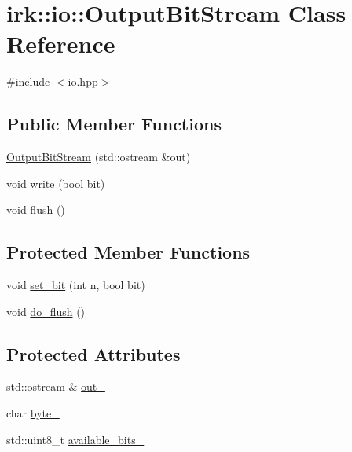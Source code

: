 \hypertarget{classirk_1_1io_1_1OutputBitStream}{}\section{irk\+:\+:io\+:\+:Output\+Bit\+Stream Class Reference}
\label{classirk_1_1io_1_1OutputBitStream}


{\ttfamily \#include $<$io.\+hpp$>$}

\subsection*{Public Member Functions}
\begin{DoxyCompactItemize}
\item 
\mbox{\hyperlink{classirk_1_1io_1_1OutputBitStream_a09be387800221d227a8d2f7711a1df9a}{Output\+Bit\+Stream}} (std\+::ostream \&out)
\item 
void \mbox{\hyperlink{classirk_1_1io_1_1OutputBitStream_ada8f9a48f0e7ab925c6825f70c3761f6}{write}} (bool bit)
\item 
void \mbox{\hyperlink{classirk_1_1io_1_1OutputBitStream_a7222961ff1996d3e322ff647e4683478}{flush}} ()
\end{DoxyCompactItemize}
\subsection*{Protected Member Functions}
\begin{DoxyCompactItemize}
\item 
void \mbox{\hyperlink{classirk_1_1io_1_1OutputBitStream_acb934dcfb45891f11af8d250fef95335}{set\+\_\+bit}} (int n, bool bit)
\item 
void \mbox{\hyperlink{classirk_1_1io_1_1OutputBitStream_a7b69dabd8223aff5c57339997abe7f5f}{do\+\_\+flush}} ()
\end{DoxyCompactItemize}
\subsection*{Protected Attributes}
\begin{DoxyCompactItemize}
\item 
std\+::ostream \& \mbox{\hyperlink{classirk_1_1io_1_1OutputBitStream_a570da7c5fc4509bedf6e1701b3a2ea6c}{out\+\_\+}}
\item 
char \mbox{\hyperlink{classirk_1_1io_1_1OutputBitStream_ad1ff5f68aeccbfdaea26a676b92f1081}{byte\+\_\+}}
\item 
std\+::uint8\+\_\+t \mbox{\hyperlink{classirk_1_1io_1_1OutputBitStream_abccbb4b943d9d19c7f733bb1250a2a09}{available\+\_\+bits\+\_\+}}
\end{DoxyCompactItemize}


